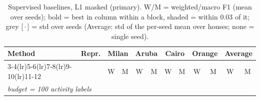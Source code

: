 \begin{table}[H]
\centering\small
\caption{Supervised baselines, L1 masked (primary). W/M = weighted/macro F1 (mean over seeds); bold = best in column within a block, shaded = within 0.03 of it; grey [\,$\cdot$\,] = std over seeds (Average: std of the per-seed mean over houses; none = single seed).}
\label{tab:base_l1_masked}
\setlength{\tabcolsep}{3.2pt}
\begin{tabular}{llcc|cc|cc|cc|cc}
\toprule
Method & Repr. & \multicolumn{2}{c}{Milan} & \multicolumn{2}{c}{Aruba} & \multicolumn{2}{c}{Cairo} & \multicolumn{2}{c}{Orange} & \multicolumn{2}{c}{Average} \\
\cmidrule(lr){3-4}\cmidrule(lr){5-6}\cmidrule(lr){7-8}\cmidrule(lr){9-10}\cmidrule(lr){11-12}
 & & W & M & W & M & W & M & W & M & W & M \\
\midrule
\multicolumn{12}{l}{\textit{budget = 100 activity labels}} \\
\midrule

\end{tabular}
\end{table}
